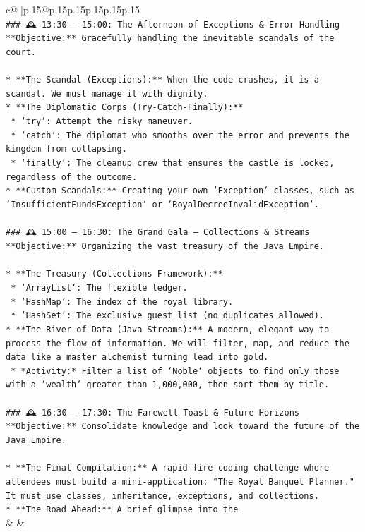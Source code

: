 \documentclass{article}
\begin{document}
{\begin{supertabular}{c@{$\;$}|p{.15\linewidth}@{}p{.15\linewidth}p{.15\linewidth}p{.15\linewidth}p{.15\linewidth}p{.15\linewidth}}
{{{\\ 
\texttt{\#\#\# 🕰️ 13:30 – 15:00: The Afternoon of Exceptions \& Error Handling} \\
\texttt{**Objective:** Gracefully handling the inevitable scandals of the court.} \\
\\ 
\texttt{*   **The Scandal (Exceptions):** When the code crashes, it is a scandal. We must manage it with dignity.} \\
\texttt{*   **The Diplomatic Corps (Try{-}Catch{-}Finally):**} \\
\texttt{    *   `try`: Attempt the risky maneuver.} \\
\texttt{    *   `catch`: The diplomat who smooths over the error and prevents the kingdom from collapsing.} \\
\texttt{    *   `finally`: The cleanup crew that ensures the castle is locked, regardless of the outcome.} \\
\texttt{*   **Custom Scandals:** Creating your own `Exception` classes, such as `InsufficientFundsException` or `RoyalDecreeInvalidException`.} \\
\\ 
\texttt{\#\#\# 🕰️ 15:00 – 16:30: The Grand Gala – Collections \& Streams} \\
\texttt{**Objective:** Organizing the vast treasury of the Java Empire.} \\
\\ 
\texttt{*   **The Treasury (Collections Framework):**} \\
\texttt{    *   `ArrayList`: The flexible ledger.} \\
\texttt{    *   `HashMap`: The index of the royal library.} \\
\texttt{    *   `HashSet`: The exclusive guest list (no duplicates allowed).} \\
\texttt{*   **The River of Data (Java Streams):** A modern, elegant way to process the flow of information. We will filter, map, and reduce the data like a master alchemist turning lead into gold.} \\
\texttt{    *   *Activity:* Filter a list of `Noble` objects to find only those with a `wealth` greater than 1,000,000, then sort them by title.} \\
\\ 
\texttt{\#\#\# 🕰️ 16:30 – 17:30: The Farewell Toast \& Future Horizons} \\
\texttt{**Objective:** Consolidate knowledge and look toward the future of the Java Empire.} \\
\\ 
\texttt{*   **The Final Compilation:** A rapid{-}fire coding challenge where attendees must build a mini{-}application: "The Royal Banquet Planner." It must use classes, inheritance, exceptions, and collections.} \\
\texttt{*   **The Road Ahead:** A brief glimpse into the} \\
            }
        }
    }
    & & \\ \\


\end{supertabular}}
\end{document}
